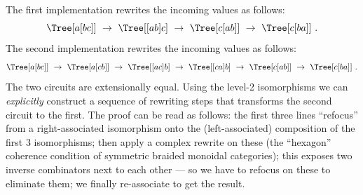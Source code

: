 \documentclass{article}
\begin{document}
\noindent The first implementation rewrites the incoming values as follows:
\[
\Tree [ {\small a} [ {\small b} {\small c} ] ] ~\to~
\Tree [ [ {\small a} {\small b} ] {\small c} ] ~\to~
\Tree [ {\small c} [ {\small a} {\small b} ] ] ~\to~
\Tree [ {\small c} [ {\small b} {\small a} ] ] ~.
\]
\noindent
The second implementation rewrites the incoming values as follows:
\[
\Tree [ {\small a} [ {\small b} {\small c} ] ] ~\to~
\Tree [ {\small a} [ {\small c} {\small b} ] ] ~\to~
\Tree [ [ {\small a} {\small c} ] {\small b} ] ~\to~
\Tree [ [ {\small c} {\small a} ] {\small b} ] ~\to~
\Tree [ {\small c} [ {\small a} {\small b} ] ] ~\to~
\Tree [ {\small c} [ {\small b} {\small a} ] ] ~.
\]
\noindent The two circuits are extensionally equal. Using the level-2
isomorphisms we can \emph{explicitly} construct a sequence of
rewriting steps that transforms the second circuit to the first.  The proof
can be read as follows: the first three lines ``refocus'' from a right-associated
isomorphism onto the (left-associated) composition of the first $3$ isomorphisms;
then apply a complex rewrite on these (the ``hexagon'' coherence condition
of symmetric braided monoidal categories); this exposes two inverse combinators
next to each other --- so we have to refocus on these to eliminate them; we
finally re-associate to get the result.
\end{document}
